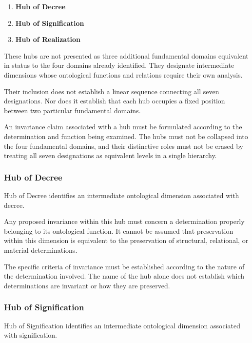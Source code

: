 \begin{enumerate}
    \item \textbf{Hub of Decree}
    \item \textbf{Hub of Signification}
    \item \textbf{Hub of Realization}
\end{enumerate}

These hubs are not presented as three additional
fundamental domains equivalent in status to
the four domains already identified. They
designate intermediate dimensions whose
ontological functions and relations require
their own analysis.

Their inclusion does not establish a linear
sequence connecting all seven designations.
Nor does it establish that each hub occupies
a fixed position between two particular
fundamental domains.

An invariance claim associated with a hub
must be formulated according to the
determination and function being examined.
The hubs must not be collapsed into the
four fundamental domains, and their
distinctive roles must not be erased by
treating all seven designations as equivalent
levels in a single hierarchy.



\subsubsection{Hub of Decree}

Hub of Decree identifies an intermediate
ontological dimension associated with decree.

Any proposed invariance within this hub
must concern a determination properly
belonging to its ontological function.
It cannot be assumed that preservation
within this dimension is equivalent to
the preservation of structural, relational,
or material determinations.

The specific criteria of invariance must
be established according to the nature
of the determination involved. The name
of the hub alone does not establish
which determinations are invariant or
how they are preserved.

\subsubsection{Hub of Signification}

Hub of Signification identifies an intermediate
ontological dimension associated with
signification.

